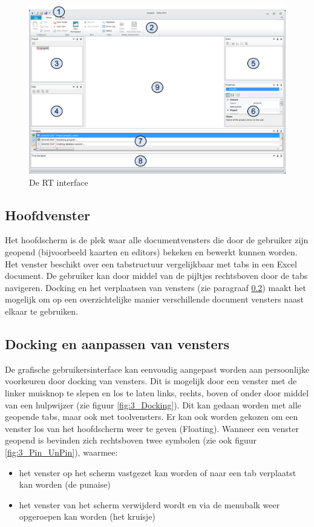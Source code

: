 \begin{figure}[H]
	\centering
		\includegraphics[width=\textwidth]{figures/chapter_general/rt_Welcome.png}
		\caption{De RT interface}
	\label{fig:1_RT_Welcome_Page}
\end{figure}

\subsection{Hoofdvenster}
Het hoofdscherm is de plek waar alle documentvensters die door de gebruiker zijn geopend (bijvoorbeeld kaarten en editors) bekeken en bewerkt kunnen worden. Het venster beschikt over een tabstructuur vergelijkbaar met tabs in een Excel document. De gebruiker kan door middel van de pijltjes rechtsboven door de tabs navigeren. Docking en het verplaatsen van vensters (zie paragraaf \ref{sec:RT_Docking}) maakt het mogelijk om op een overzichtelijke manier verschillende document vensters naast elkaar te gebruiken.

\subsection{Docking en aanpassen van vensters}
\label{sec:RT_Docking}
De grafische gebruikersinterface kan eenvoudig aangepast worden aan persoonlijke voorkeuren door docking van vensters. Dit is mogelijk door een venster met de linker muisknop te slepen en los te laten links, rechts, boven of onder door middel van een hulpwijzer (zie figuur \ref{fig:3_Docking}). Dit kan gedaan worden met alle geopende tabs, maar ook met toolvensters. Er kan ook worden gekozen om een venster los van het hoofdscherm weer te geven (Floating). Wanneer een venster geopend is bevinden zich rechtsboven twee symbolen (zie ook figuur \ref{fig:3_Pin_UnPin}), waarmee:
\begin{itemize}
\item het venster op het scherm vastgezet kan worden of naar een tab verplaatst kan worden (de punaise)
\item het venster van het scherm verwijderd wordt en via de menubalk weer opgeroepen kan worden (het kruisje)
\end{itemize}

